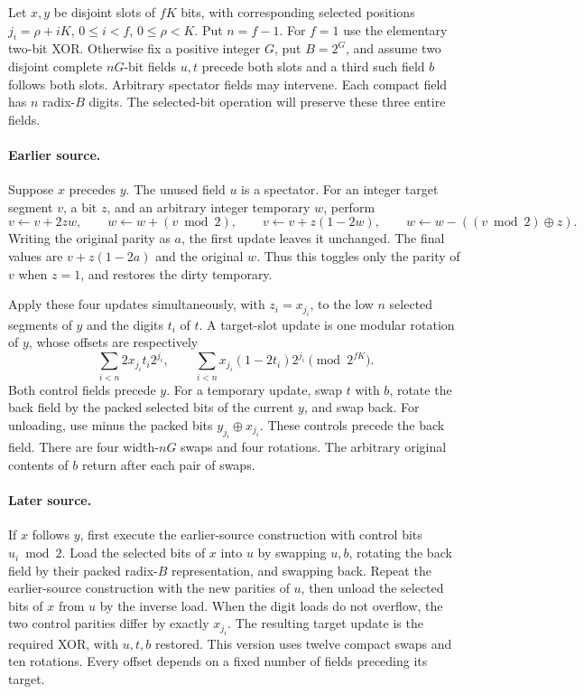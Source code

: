 Let $x,y$ be disjoint slots of $fK$ bits, with corresponding selected
positions $j_i=\rho+iK$, $0\le i<f$, $0\le\rho<K$. Put $n=f-1$.
For $f=1$ use the elementary two-bit XOR. Otherwise fix a positive integer
$G$, put $B=2^G$, and assume two disjoint complete $nG$-bit fields $u,t$
precede both slots and a third such field $b$ follows both slots. Arbitrary
spectator fields may intervene. Each compact field has $n$ radix-$B$ digits.
The selected-bit operation will preserve these three entire fields.

\paragraph{Earlier source.}
Suppose $x$ precedes $y$. The unused field $u$ is a spectator. For an integer
target segment $v$, a bit $z$, and an arbitrary integer temporary $w$, perform
\[
 v\gets v+2zw,\qquad w\gets w+(v\bmod2),\qquad
 v\gets v+z(1-2w),\qquad w\gets w-((v\bmod2)\mathbin\oplus z).
\]
Writing the original parity as $a$, the first update leaves it unchanged.
The final values are $v+z(1-2a)$ and the original $w$. Thus this toggles
only the parity of $v$ when $z=1$, and restores the dirty temporary.

Apply these four updates simultaneously, with $z_i=x_{j_i}$, to the low
$n$ selected segments of $y$ and the digits $t_i$ of $t$. A target-slot
update is one modular rotation of $y$, whose offsets are respectively
\[
 \sum_{i<n}2x_{j_i}t_i2^{j_i},\qquad
 \sum_{i<n}x_{j_i}(1-2t_i)2^{j_i} \pmod{2^{fK}}.
\]
Both control fields precede $y$. For a temporary update, swap $t$ with $b$,
rotate the back field by the packed selected bits of the current $y$, and
swap back. For unloading, use minus the packed bits
$y_{j_i}\mathbin\oplus x_{j_i}$. These controls precede the back field.
There are four width-$nG$ swaps and four rotations. The arbitrary original
contents of $b$ return after each pair of swaps.

\paragraph{Later source.}
If $x$ follows $y$, first execute the earlier-source construction with control
bits $u_i\bmod2$. Load the selected bits of $x$ into $u$ by swapping $u,b$,
rotating the back field by their packed radix-$B$ representation, and swapping
back. Repeat the earlier-source construction with the new parities of $u$,
then unload the selected bits of $x$ from $u$ by the inverse load.
When the digit loads do not overflow, the two control parities differ by
exactly $x_{j_i}$. The resulting target update is the required XOR, with
$u,t,b$ restored. This version uses twelve compact swaps and ten rotations.
Every offset depends on a fixed number of fields preceding its target.

